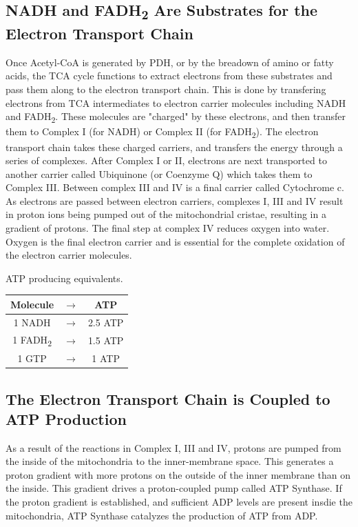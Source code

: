 \documentclass{tufte-handout}
\begin{document}
\subsection{NADH and FADH\textsubscript{2} Are Substrates for the Electron Transport Chain}
Once Acetyl-CoA is generated by PDH, or by the breadown of amino or fatty acids, the TCA cycle functions to extract electrons from these substrates and pass them along to the electron transport chain.  This is done by transfering electrons from TCA intermediates to electron carrier molecules including NADH and FADH\textsubscript{2}.  These molecules are "charged" by these electrons, and then transfer them to Complex I (for NADH) or Complex II (for FADH\textsubscript{2}).  The electron transport chain takes these charged carriers, and transfers the energy through a series of complexes.  After Complex I or II, electrons are next transported to another carrier called Ubiquinone (or Coenzyme Q) which takes them to Complex III.  Between complex III and IV is a final carrier called Cytochrome c.  As electrons are passed between electron carriers, complexes I, III and IV result in proton ions being pumped out of the mitochondrial cristae, resulting in a gradient of protons.  The final step at complex IV reduces oxygen into water.  Oxygen is the final electron carrier and is essential for the complete oxidation of the electron carrier molecules.

\begin{margintable}
\centering
\caption{ATP producing equivalents.}
\label{tab:atp-equivalents}
\begin{tabular}{ccc}
\hline
\textbf {Molecule} & $\rightarrow$ & \textbf{ATP}\\
\hline
1 NADH & $\rightarrow$ & 2.5 ATP \\
1 FADH\textsubscript{2} & $\rightarrow$ &  1.5 ATP  \\
1 GTP & $\rightarrow$ &  1 ATP  \\
\hline
\end{tabular}
\end{margintable}

\subsection{The Electron Transport Chain is Coupled to ATP Production}

As a result of the reactions in Complex I, III and IV, protons are pumped from the inside of the mitochondria to the inner-membrane space.  This generates a proton gradient with more protons on the outside of the inner membrane than on the inside.  This gradient drives a proton-coupled pump called ATP Synthase.  If the proton gradient is established, and sufficient ADP levels are present insdie the mitochondria, ATP Synthase catalyzes the production of ATP from ADP.
\end{document}
